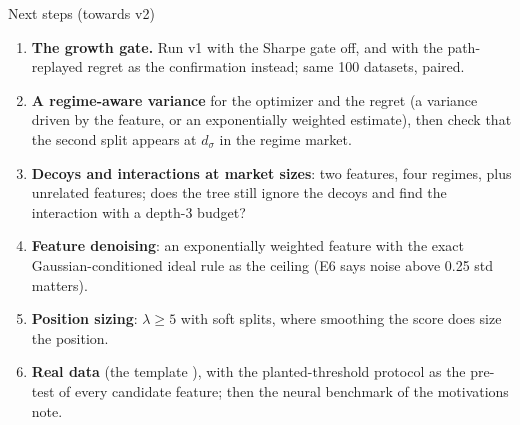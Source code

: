 \documentclass[10pt,aspectratio=169]{beamer}
\newcommand{\code}[1]{\texttt{\detokenize{#1}}}
\newcommand{\1}{\mathbf{1}}
\begin{document}
\begin{frame}{Next steps (towards v2)}
\begin{enumerate}
\item \textbf{The growth gate.} Run v1 with the Sharpe gate off, and with the path-replayed regret as the confirmation instead; same 100 datasets, paired.
\item \textbf{A regime-aware variance} for the optimizer and the regret (a variance driven by the feature, or an exponentially weighted estimate), then check that the second split appears at $d_\sigma$ in the regime market.
\item \textbf{Decoys and interactions at market sizes}: two features, four regimes, plus unrelated features; does the tree still ignore the decoys and find the interaction with a depth-3 budget?
\item \textbf{Feature denoising}: an exponentially weighted feature with the exact Gaussian-conditioned ideal rule as the ceiling (E6 says noise above 0.25 std matters).
\item \textbf{Position sizing}: $\lambda\ge5$ with soft splits, where smoothing the score does size the position.
\item \textbf{Real data} (the template \code{run_real_data.py}), with the planted-threshold protocol as the pre-test of every candidate feature; then the neural benchmark of the motivations note.
\end{enumerate}
\end{frame}
\end{document}
